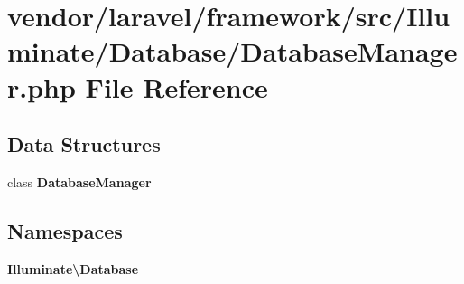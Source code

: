 \section{vendor/laravel/framework/src/\+Illuminate/\+Database/\+Database\+Manager.php File Reference}
\label{_database_manager_8php}
\subsection*{Data Structures}
\begin{DoxyCompactItemize}
\item 
class {\bf Database\+Manager}
\end{DoxyCompactItemize}
\subsection*{Namespaces}
\begin{DoxyCompactItemize}
\item 
 {\bf Illuminate\textbackslash{}\+Database}
\end{DoxyCompactItemize}
